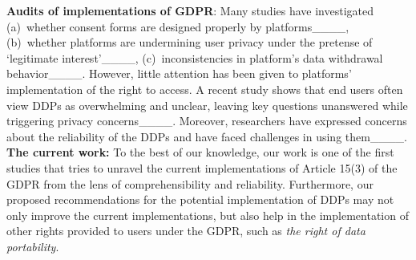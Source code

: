 \noindent
\textbf{Audits of implementations of GDPR}:
Many studies have investigated (a)~whether consent forms are designed properly by platforms____, (b)~whether platforms are undermining user privacy under the pretense of `legitimate interest'____, (c)~inconsistencies in platform's data withdrawal behavior____.
%
However, little attention has been given to platforms' implementation of the right to access. 
A recent study shows that end users often view DDPs as overwhelming and unclear, leaving key questions unanswered while triggering privacy concerns____.
Moreover, researchers have expressed concerns about the reliability of the DDPs and have faced challenges in using them____.\\
\noindent
\textbf{The current work:} To the best of our knowledge, our work is one of the first studies that tries to unravel the current implementations of Article 15(3) of the GDPR from the lens of comprehensibility and reliability.
Furthermore, our proposed recommendations for the potential implementation of DDPs may not only improve the current implementations, but also help in the implementation of other rights provided to users under the GDPR, such as \textit{the right of data portability}.

